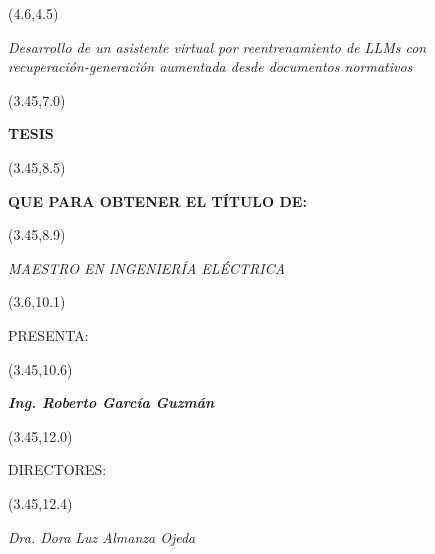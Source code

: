 \begin{textblock}{10}(4.6,4.5)
    \begin{center} \LARGE {\textit{Desarrollo de un asistente virtual por reentrenamiento de LLMs con recuperación-generación aumentada desde documentos normativos}}
    \end{center}
\end{textblock}

\begin{textblock}{12}(3.45,7.0)
    \begin{center} \huge{\bf{TESIS}} \end{center}
\end{textblock}

\begin{textblock}{12}(3.45,8.5)
    \begin{center} \small{\bf{ QUE PARA OBTENER EL TÍTULO DE:}} \end{center}
\end{textblock}

\begin{textblock}{12}(3.45,8.9)
    \begin{center} \emph {MAESTRO EN INGENIERÍA ELÉCTRICA} \end{center}
\end{textblock}

\begin{textblock}{12}(3.6,10.1)
    \begin{center} PRESENTA: \end{center}
\end{textblock}

\begin{textblock}{12}(3.45,10.6)
    \begin{center} \Large{\textit{\textbf{Ing. Roberto García Guzmán}}} \end{center}
\end{textblock}

\begin{textblock}{12}(3.45,12.0)
    \begin{center} DIRECTORES: \end{center}
\end{textblock}

\begin{textblock}{12}(3.45,12.4)
    \begin{center} \large\textit{Dra. Dora Luz Almanza Ojeda}  \end{center}
\end{textblock}


